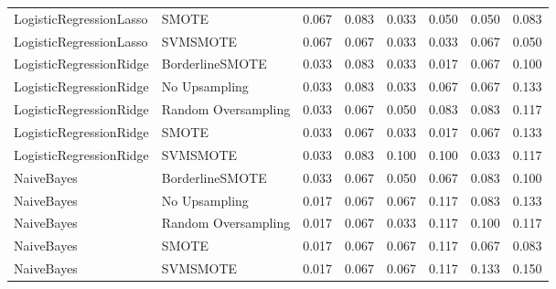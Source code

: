 \begin{tabular}{llllllll}
     LogisticRegressionLasso &               SMOTE & 0.067 &                     0.083 &                 0.033 &                  0.050 &                                   0.050 &     0.083 \\
     LogisticRegressionLasso &            SVMSMOTE & 0.067 &                     0.067 &                 0.033 &                  0.033 &                                   0.067 &     0.050 \\
     LogisticRegressionRidge &     BorderlineSMOTE & 0.033 &                     0.083 &                 0.033 &                  0.017 &                                   0.067 &     0.100 \\
     LogisticRegressionRidge &       No Upsampling & 0.033 &                     0.083 &                 0.033 &                  0.067 &                                   0.067 &     0.133 \\
     LogisticRegressionRidge & Random Oversampling & 0.033 &                     0.067 &                 0.050 &                  0.083 &                                   0.083 &     0.117 \\
     LogisticRegressionRidge &               SMOTE & 0.033 &                     0.067 &                 0.033 &                  0.017 &                                   0.067 &     0.133 \\
     LogisticRegressionRidge &            SVMSMOTE & 0.033 &                     0.083 &                 0.100 &                  0.100 &                                   0.033 &     0.117 \\
                  NaiveBayes &     BorderlineSMOTE & 0.033 &                     0.067 &                 0.050 &                  0.067 &                                   0.083 &     0.100 \\
                  NaiveBayes &       No Upsampling & 0.017 &                     0.067 &                 0.067 &                  0.117 &                                   0.083 &     0.133 \\
                  NaiveBayes & Random Oversampling & 0.017 &                     0.067 &                 0.033 &                  0.117 &                                   0.100 &     0.117 \\
                  NaiveBayes &               SMOTE & 0.017 &                     0.067 &                 0.067 &                  0.117 &                                   0.067 &     0.083 \\
                  NaiveBayes &            SVMSMOTE & 0.017 &                     0.067 &                 0.067 &                  0.117 &                                   0.133 &     0.150 \\

\end{tabular}
